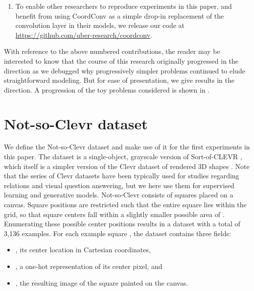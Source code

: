 \documentclass{article}
\begin{document}
\begin{enumerate}
\item
To enable other researchers to reproduce experiments in this paper, 
and benefit from using CoordConv as a simple drop-in replacement of the convolution layer in their models,
we release our code at \url{https://github.com/uber-research/coordconv}.

\end{enumerate}



With reference to the above numbered contributions, the reader may be interested to know that the course of this research originally progressed in the
 direction as we debugged why progressively simpler problems continued to elude straightforward modeling. But for ease of presentation, we give results in the  direction.
A progression of the toy problems considered is shown in .




















\section{Not-so-Clevr dataset}
\vspace*{-.6em}

We define the Not-so-Clevr dataset and make use of it for the first experiments in this paper. The dataset is a single-object, grayscale version of Sort-of-CLEVR \cite{sortofclevr}, which itself is a simpler version of the Clevr dataset of rendered 3D shapes \cite{clevr}.
Note that the series of Clevr datasets have been typically used for studies regarding relations and visual question answering, but we here use them for supervised learning and generative models.
Not-so-Clevr consists of  squares placed on a  canvas. Square positions are restricted such that the entire square lies within the  grid, so that square centers fall within a slightly smaller possible area of . Enumerating these possible center positions results in a dataset with a total of 3,136 examples.
For each example square , the dataset contains three fields:

\vspace*{-.6em}
\begin{itemize}
\item , its center location in  Cartesian coordinates, \vspace*{-.2em}
\item , a one-hot representation of its center pixel, and \vspace*{-.2em}
\item , the resulting  image of the square painted on the canvas.
\end{itemize}
\vspace*{-.6em}
\end{document}
